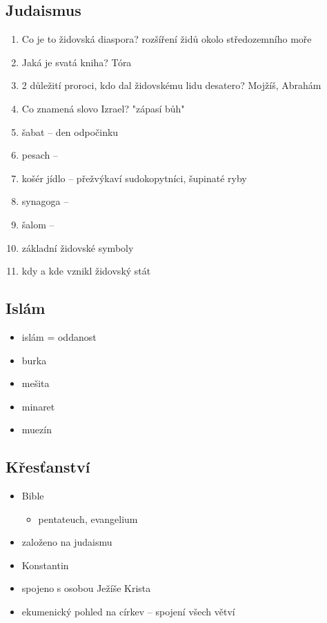 \subsection{Judaismus}
\begin{enumerate}
\item Co je to židovská diaspora? rozšíření židů okolo středozemního moře
\item Jaká je svatá kniha? Tóra
\item 2 důležití proroci, kdo dal židovskému lidu desatero? Mojžíš, Abrahám
\item Co znamená slovo Izrael? "zápasí bůh"
\item šabat -- den odpočinku
\item pesach  -- 
\item košér jídlo -- přežvýkaví sudokopytníci, šupinaté ryby
\item synagoga --
\item šalom --
\item základní židovské symboly
\item kdy a kde vznikl židovský stát
\end{enumerate}

\subsection{Islám}
\begin{itemize}
\item islám = oddanost
\item burka
\item mešita
\item minaret
\item muezín
\end{itemize}

\subsection{Křesťanství}
\begin{itemize}
\item Bible
	\begin{itemize}
	\item pentateuch, evangelium
	\end{itemize}
\item založeno na judaismu
\item Konstantin
\item spojeno s osobou Ježíše Krista
\item ekumenický pohled na církev -- spojení všech větví
\end{itemize}

